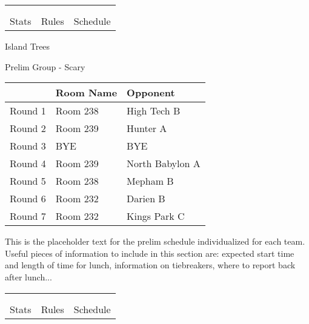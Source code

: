 \documentclass{article}%
\begin{document}
\vspace*{30pt}%
\newline%
%
\begin{tabularx}{\textwidth}{YYY}%
  &  &  \\%
\\%
Stats&Rules&Schedule\\%
\end{tabularx}%
\newpage%
%
\begin{center}%
\begin{Huge}%
Island Trees%
\end{Huge}%
\vspace*{12pt}%
\linebreak%
\begin{Large}%
Prelim Group {-} Scary%
\end{Large}%
\end{center}%
\vspace*{4pt}%
\begin{tabularx}{\textwidth}{|c|Y|Y|}%
\hline%
&Room Name&Opponent\\%
\hline%
Round 1&Room 238&High Tech B\\%
Round 2&Room 239&Hunter A\\%
Round 3&BYE&BYE\\%
Round 4&Room 239&North Babylon A\\%
Round 5&Room 238&Mepham B\\%
Round 6&Room 232&Darien B\\%
Round 7&Room 232&Kings Park C\\%
\hline%
\end{tabularx}%
\vspace*{30pt}%
\linebreak%
This is the placeholder text for the prelim schedule individualized for each team. Useful pieces of information to include in this section are: expected start time and length of time for lunch, information on tiebreakers, where to report back after lunch...%
\vspace*{30pt}%
\newline%
%
\begin{tabularx}{\textwidth}{YYY}%
  &  &  \\%
\\%
Stats&Rules&Schedule\\%
\end{tabularx}%
\end{document}

